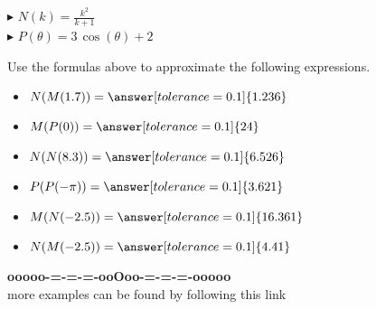 \documentclass{ximera}
\begin{document}
$\blacktriangleright$ $N(k) = \frac{k^2}{k + 1}$ \\

$\blacktriangleright$ $P(\theta) = 3 \, \cos(\theta) + 2$










\begin{question}


Use the formulas above to approximate the following expressions.



\begin{itemize}

\item $N(M(1.7)) = \answer[tolerance=0.1]{1.236}$ \\

\item $M(P(0)) = \answer[tolerance=0.1]{24}$ \\

\item $N(N(8.3)) = \answer[tolerance=0.1]{6.526}$ \\

\item $P(P(-\pi)) = \answer[tolerance=0.1]{3.621}$ \\

\item $M(N(-2.5)) = \answer[tolerance=0.1]{16.361}$ \\

\item $N(M(-2.5)) = \answer[tolerance=0.1]{4.41}$ \\

\end{itemize}



\end{question}




















\begin{center}
\textbf{\textcolor{green!50!black}{ooooo-=-=-=-ooOoo-=-=-=-ooooo}} \\

more examples can be found by following this link\\ 

\end{center}
\end{document}
